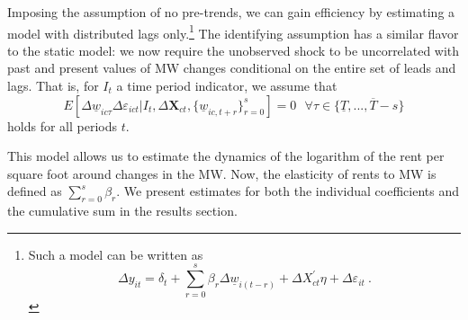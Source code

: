 Imposing the assumption of no pre-trends, we can gain efficiency by estimating a model with 
distributed lags only.\footnote{Such a model can be written as
	$$ \Delta y_{it} = \delta_t
					 + \sum_{r=0}^{s}\beta_r \Delta \underline{w}_{i(t-r)}
					 + \Delta X^{'}_{ct}\eta
					 + \Delta \varepsilon_{it} \ .$$}
The identifying assumption has a similar flavor to the static model: we now require the 
unobserved shock to be uncorrelated with past and present values of MW changes conditional 
on the entire set of leads and lags. That is, for $I_t$ a time period indicator, we assume 
that
\begin{equation*}\label{eq:identifying-leads-lags}
	E\left[\Delta \underline{w}_{ic \tau} \Delta \varepsilon_{ict} | 
			I_t, \Delta \mathbf{X}_{ct}, \{\underline{w}_{ic,t+r}\}_{r=0}^s \right] = 0
	\ \ \ \forall \tau \in \{\underline{T}, ..., \overline{T} - s\} 
\end{equation*}
holds for all periods $t$.


This model allows us to estimate the dynamics of the logarithm of the rent per square foot 
around changes in the MW. Now, the elasticity of rents to MW is defined as $\sum_{r=0}^s 
\beta_r$. We present estimates for both the individual coefficients and the cumulative sum 
in the results section. 



